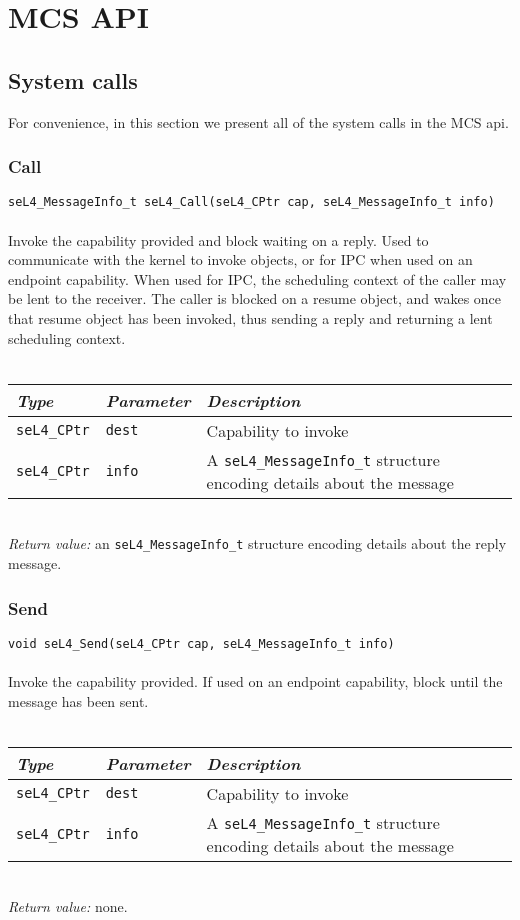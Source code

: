 
\chapter{MCS API}
\label{appendix:api}
\newcommand{\apidoc}[6]
{
    \subsection{\label{api:#1}#2}
    \texttt{#4}\\
    \vspace{3pt}\\
    \noindent
    #3\\
    \vspace{3pt}\\
    \begin{tabular}{p{0.15\textwidth}p{0.15\textwidth}p{0.7\textwidth}}\toprule
        \emph{Type} & \emph{Parameter} & \emph{Description} \\\midrule
         #5
        \bottomrule
    \end{tabular}
    \vspace{3pt}\\
    \noindent
    \textit{Return value:} #6 
}

\newcommand{\param}[3]
{
    \texttt{#1} & \texttt{#2} & #3 \\
}
\section{System calls}

For convenience, in this section we present all of the system calls in the MCS api.

\apidoc{call}
{Call}
{Invoke the capability provided and block waiting on a reply. Used to communicate with the kernel 
 to invoke objects, or for \gls{IPC} when used on an endpoint capability. When used for \gls{IPC}, 
  the scheduling context of the caller may be lent to the receiver. The caller is blocked on a
  resume object, and wakes once that resume object has been invoked, thus sending a reply and
  returning a lent scheduling context.}
  {seL4_MessageInfo_t seL4_Call(seL4_CPtr cap, seL4_MessageInfo_t info)}
{
    \param{seL4_CPtr}{dest}{Capability to invoke}
    \param{seL4_CPtr}{info}{A \texttt{seL4_MessageInfo_t} structure encoding details about the message}
}
{an \texttt{seL4_MessageInfo_t} structure encoding details about the reply message.}

\apidoc{send}
{Send}
{Invoke the capability provided. If used on an endpoint capability, block until the message has been
sent.}
{void seL4_Send(seL4_CPtr cap, seL4_MessageInfo_t info)}
{
    \param{seL4_CPtr}{dest}{Capability to invoke}
    \param{seL4_CPtr}{info}{A \texttt{seL4_MessageInfo_t} structure encoding details about the message}
}
{none.}


